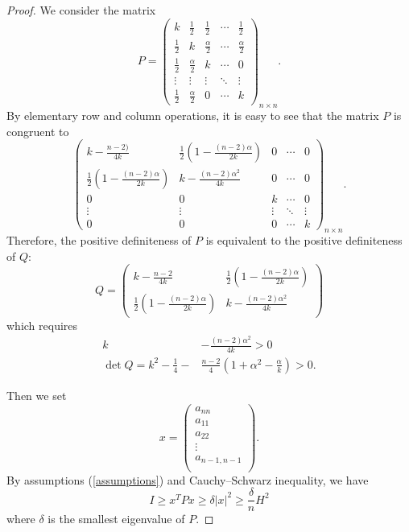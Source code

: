 \documentclass[10pt,a4paper]{amsart}
\begin{document}
\begin{proof}
We consider the matrix
\begin{equation}\label{matrix_A} 
P=\begin{pmatrix} k & \frac{1}{2} & \frac{1}{2} & \cdots & \frac{1}{2} \\ \frac{1}{2} & k & \frac{\alpha}{2} & \cdots & \frac{\alpha}{2} \\ \frac{1}{2} & \frac{\alpha}{2} & k &\cdots & 0\\ \vdots & \vdots & \vdots & \ddots & \vdots\\ \frac{1}{2} & \frac{\alpha}{2} & 0 & \cdots & k \end{pmatrix}_{n\times n}.   
\end{equation} 
By elementary row and column operations, it is easy to see that the matrix $P$ is congruent to 
\begin{equation*}
    \begin{pmatrix}
         k-\frac{n-2)}{4k} & \frac{1}{2}\left(1-\frac{(n-2)\alpha}{2k}\right) & 0 & \cdots & 0 \\ \frac{1}{2}\left(1-\frac{(n-2)\alpha}{2k}\right)  & k-\frac{(n-2)\alpha^2}{4k} & 0 & \cdots & 0 \\ 0 & 0 & k &\cdots & 0\\ \vdots & \vdots & \vdots & \ddots & \vdots\\ 0 & 0 & 0 & \cdots & k
    \end{pmatrix}_{n\times n}.
\end{equation*}
Therefore, the positive definiteness of $P$ is equivalent to the positive definiteness of $Q$:
\begin{equation*}
    Q=\begin{pmatrix}
        k-\frac{n-2}{4k} & \frac{1}{2}\left(1-\frac{(n-2)\alpha}{2k}\right)  \\ \frac{1}{2}\left(1-\frac{(n-2)\alpha}{2k}\right)  & k-\frac{(n-2)\alpha^2}{4k}
    \end{pmatrix}
\end{equation*}
which requires 
\begin{equation}\label{two-eigenvalues}
    \begin{split}
       k&-\frac{(n-2)\alpha^2}{4k}>0\\
        \det Q=k^2-\frac{1}{4}-&\frac{n-2}{4}\left(1+\alpha^2-\frac{\alpha}{k}\right)>0.
    \end{split}
\end{equation}


Then we set \[x=\begin{pmatrix}a_{nn}\\ a_{11}\\ a_{22}\\ \vdots\\ a_{n-1,n-1}\\ \end{pmatrix}.\] By assumptions (\ref{assumptions}) and Cauchy--Schwarz inequality, we have \[I\geq x^TPx\geq \delta |x|^2\geq \frac{\delta}{n}H^2\] where $\delta$ is the smallest eigenvalue of $P$.

\end{proof}
\end{document}
